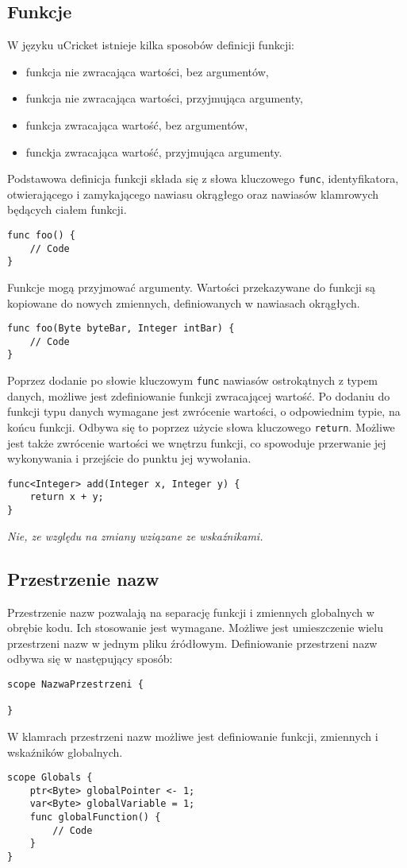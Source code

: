 \subsection{Funkcje}
W języku uCricket istnieje kilka sposobów definicji funkcji:
\begin{itemize}
\item funkcja nie zwracająca wartości, bez argumentów,
\item funkcja nie zwracająca wartości, przyjmująca argumenty,
\item funkcja zwracająca wartość, bez argumentów,
\item funckja zwracająca wartość, przyjmująca argumenty. 
\end{itemize}

Podstawowa definicja funkcji składa się z słowa kluczowego \lstinline|func|, identyfikatora, otwierającego i zamykającego nawiasu okrągłego oraz nawiasów klamrowych będących ciałem funkcji.
\begin{lstlisting}
func foo() {
	// Code
}
\end{lstlisting}

Funkcje mogą przyjmować argumenty. Wartości przekazywane do funkcji są kopiowane do nowych zmiennych, definiowanych w nawiasach okrągłych.
\begin{lstlisting}
func foo(Byte byteBar, Integer intBar) {
	// Code
}
\end{lstlisting}

Poprzez dodanie po słowie kluczowym \lstinline|func| nawiasów ostrokątnych z typem danych, możliwe jest zdefiniowanie funkcji zwracającej wartość. Po dodaniu do funkcji typu danych wymagane jest zwrócenie wartości, o odpowiednim typie, na końcu funkcji. Odbywa się to poprzez użycie słowa kluczowego \lstinline|return|. Możliwe jest także zwrócenie wartości we wnętrzu funkcji, co spowoduje przerwanie jej wykonywania i przejście do punktu jej wywołania.
\begin{lstlisting}
func<Integer> add(Integer x, Integer y) {
	return x + y;
}
\end{lstlisting}
\textit{Nie, ze względu na zmiany wziązane ze wskaźnikami.}
\subsection{Przestrzenie nazw}
Przestrzenie nazw pozwalają na separację funkcji i zmiennych globalnych w obrębie kodu. Ich stosowanie jest wymagane. Możliwe jest umieszczenie wielu przestrzeni nazw w jednym pliku źródłowym. Definiowanie przestrzeni nazw odbywa się w następujący sposób:
\begin{lstlisting}
scope NazwaPrzestrzeni {

}
\end{lstlisting}
W klamrach przestrzeni nazw możliwe jest definiowanie funkcji, zmiennych i wskaźników globalnych. 
\begin{lstlisting}
scope Globals {
	ptr<Byte> globalPointer <- 1;
	var<Byte> globalVariable = 1;
	func globalFunction() { 
		// Code	
	}
}
\end{lstlisting}

